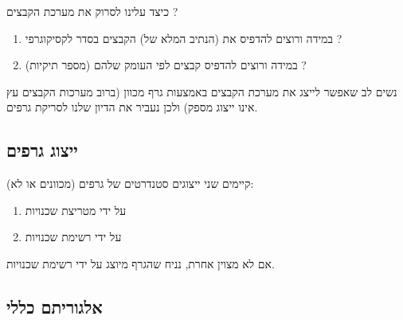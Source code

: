 כיצד עלינו לסרוק את מערכת הקבצים ? 
\begin{enumerate}
\item
במידה ורוצים להדפיס את (הנתיב המלא של) הקבצים בסדר לקסיקוגרפי ?
\item
במידה ורוצים להדפיס קבצים לפי העומק שלהם (מספר תיקיות) ?
\end{enumerate}
נשים לב שאפשר לייצג את מערכת הקבצים באמצעות גרף מכוון (ברוב מערכות הקבצים עץ אינו ייצוג מספק)
ולכן נעביר את הדיון שלנו לסריקת גרפים.

\subsection*{ייצוג גרפים}
קיימים שני ייצוגים סטנדרטים של גרפים (מכוונים או לא):
\begin{enumerate}
\item
על ידי מטריצת שכנויות
\item
על ידי רשימת שכנויות
\end{enumerate}

אם לא מצוין אחרת, נניח שהגרף מיוצג על ידי רשימת שכנויות.
\subsection*{אלגוריתם כללי}

